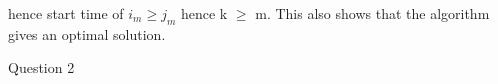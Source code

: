 \documentclass{extarticle}
\theoremstyle{remark}
\begin{document}
hence start time of $ i_m \geq j_m $
hence k $\geq$ m.
This also shows that the algorithm  gives an optimal solution.
\newpage






















\newpage


\Large{Question 2}\\
\normalsize
\end{document}
